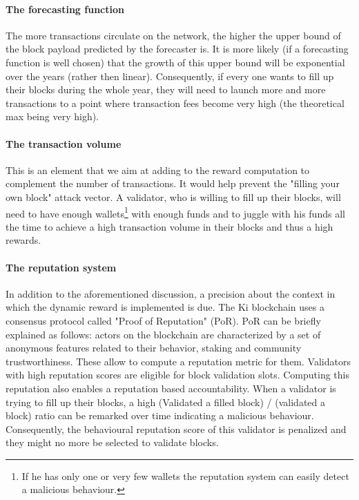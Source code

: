 \documentclass[conference]{IEEEtran}
\begin{document}
\paragraph{The forecasting function} The more transactions circulate on the network, the higher the upper bound of the block payload predicted by the forecaster is. It is more likely (if a forecasting function is well chosen) that the growth of this upper bound will be exponential over the years (rather then linear). Consequently, if every one wants to fill up their blocks during the whole year, they will need to launch more and more transactions to a point where transaction fees become very high (the theoretical max being very high).

\paragraph{The transaction volume} This is an element that we aim at adding to the reward computation to complement the number of transactions. It would help prevent the "filling your own block" attack vector. A validator, who is willing to fill up their blocks, will need to have enough wallets\footnote{If he has only one or very few wallets the reputation system can easily detect a malicious behaviour.} with enough funds and to juggle with his funds all the time to achieve a high transaction volume in their blocks and thus a high rewards. 

\paragraph{The reputation system} In addition to the aforementioned discussion, a precision about the context in which the dynamic reward is implemented is due. The Ki blockchain uses a consensus protocol called "Proof of Reputation" (PoR). PoR can be briefly explained as follows: actors on the blockchain are characterized by a set of anonymous features related to their behavior, staking and community trustworthiness. These allow to compute a reputation metric for them. Validators with high reputation scores are eligible for block validation slots. Computing this reputation also enables a reputation based accountability. When a validator is trying to fill up their blocks, a high  (Validated a filled block) / (validated a block) ratio can be remarked over time indicating a malicious behaviour. Consequently, the behavioural reputation score of this validator is penalized and they might no more be selected to validate blocks.
\end{document}
